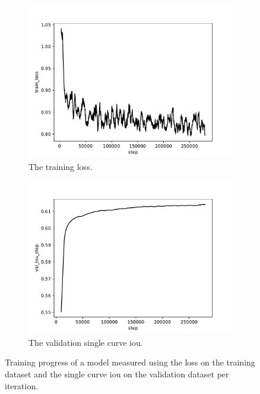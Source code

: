 \begin{figure}
    \centering
    \begin{subfigure}{.45\textwidth}
        \includegraphics[width=\textwidth]{graphics/work-artifacts/marked/server/train_loss.pdf}
        \caption{The training loss.}
    \label{fig:model.train.progress.loss}
    \end{subfigure}
    \begin{subfigure}{.45\textwidth}
        \includegraphics[width=\textwidth]{graphics/work-artifacts/marked/server/val_iou_step.pdf}
        \caption{The validation single curve \gls{iou}.}
    \label{fig:model.train.progress.iou}
    \end{subfigure}
    \caption{Training progress of a model measured using the loss on the training dataset and the single curve \gls{iou} on the validation dataset per iteration.}
    \label{fig:model.train.progress}
\end{figure}

